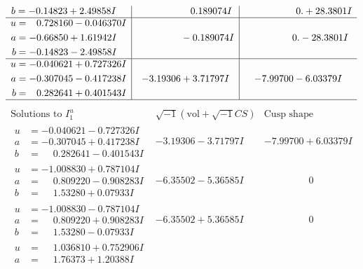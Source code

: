 \documentclass[1p]{elsarticle_modified}
\theoremstyle{definition}
\newcommand{\I}{\sqrt{-1}}
\begin{document}
$$\begin{array}{c|c|c}
\begin{aligned}
b &= -0.14823 + 2.49858 I\end{aligned}
 & \phantom{-0.000000 -}0.189074 I & \phantom{-0.000000 -}0. + 28.3801 I \\ \hline\begin{aligned}
u &= \phantom{-}0.728160 - 0.046370 I \\
a &= -0.66850 + 1.61942 I \\
b &= -0.14823 - 2.49858 I\end{aligned}
 & \phantom{-0.000000 } -0.189074 I & \phantom{-0.000000 } 0. - 28.3801 I \\ \hline\begin{aligned}
u &= -0.040621 + 0.727326 I \\
a &= -0.307045 - 0.417238 I \\
b &= \phantom{-}0.282641 + 0.401543 I\end{aligned}
 & -3.19306 + 3.71797 I & -7.99700 - 6.03379 I\\
 \hline 
 \end{array}$$\newpage$$\begin{array}{c|c|c}  
\text{Solutions to }I^u_{1}& \I (\text{vol} + \sqrt{-1}CS) & \text{Cusp shape}\\
 \hline 
\begin{aligned}
u &= -0.040621 - 0.727326 I \\
a &= -0.307045 + 0.417238 I \\
b &= \phantom{-}0.282641 - 0.401543 I\end{aligned}
 & -3.19306 - 3.71797 I & -7.99700 + 6.03379 I \\ \hline\begin{aligned}
u &= -1.008830 + 0.787104 I \\
a &= \phantom{-}0.809220 - 0.908283 I \\
b &= \phantom{-}1.53280 + 0.07933 I\end{aligned}
 & -6.35502 - 5.36585 I & \phantom{-0.000000 } 0 \\ \hline\begin{aligned}
u &= -1.008830 - 0.787104 I \\
a &= \phantom{-}0.809220 + 0.908283 I \\
b &= \phantom{-}1.53280 - 0.07933 I\end{aligned}
 & -6.35502 + 5.36585 I & \phantom{-0.000000 } 0 \\ \hline\begin{aligned}
u &= \phantom{-}1.036810 + 0.752906 I \\
a &= \phantom{-}1.76373 + 1.20388 I \\

\end{aligned}
\end{array}$$
\end{document}
